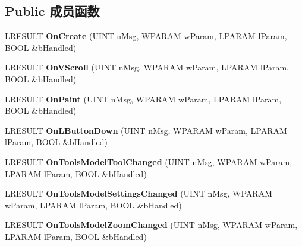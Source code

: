 \subsection*{Public 成员函数}
\begin{DoxyCompactItemize}
\item 
\mbox{\label{class_c_tool_settings_window_a26ab3a242b24b796344a30abcab493f2}} 
L\+R\+E\+S\+U\+LT {\bfseries On\+Create} (U\+I\+NT n\+Msg, W\+P\+A\+R\+AM w\+Param, L\+P\+A\+R\+AM l\+Param, B\+O\+OL \&b\+Handled)
\item 
\mbox{\label{class_c_tool_settings_window_addc0ae6941b0e945b71c7ae6681c1347}} 
L\+R\+E\+S\+U\+LT {\bfseries On\+V\+Scroll} (U\+I\+NT n\+Msg, W\+P\+A\+R\+AM w\+Param, L\+P\+A\+R\+AM l\+Param, B\+O\+OL \&b\+Handled)
\item 
\mbox{\label{class_c_tool_settings_window_a4f3221cd2616c49006933c118a2ab7c4}} 
L\+R\+E\+S\+U\+LT {\bfseries On\+Paint} (U\+I\+NT n\+Msg, W\+P\+A\+R\+AM w\+Param, L\+P\+A\+R\+AM l\+Param, B\+O\+OL \&b\+Handled)
\item 
\mbox{\label{class_c_tool_settings_window_a77e833e49432d8948fa265cd55edd414}} 
L\+R\+E\+S\+U\+LT {\bfseries On\+L\+Button\+Down} (U\+I\+NT n\+Msg, W\+P\+A\+R\+AM w\+Param, L\+P\+A\+R\+AM l\+Param, B\+O\+OL \&b\+Handled)
\item 
\mbox{\label{class_c_tool_settings_window_a6d887ba6b56ad9a18a137c0d7a8ae09b}} 
L\+R\+E\+S\+U\+LT {\bfseries On\+Tools\+Model\+Tool\+Changed} (U\+I\+NT n\+Msg, W\+P\+A\+R\+AM w\+Param, L\+P\+A\+R\+AM l\+Param, B\+O\+OL \&b\+Handled)
\item 
\mbox{\label{class_c_tool_settings_window_ac309aeaf6b653b30db271965a5d4a83f}} 
L\+R\+E\+S\+U\+LT {\bfseries On\+Tools\+Model\+Settings\+Changed} (U\+I\+NT n\+Msg, W\+P\+A\+R\+AM w\+Param, L\+P\+A\+R\+AM l\+Param, B\+O\+OL \&b\+Handled)
\item 
\mbox{\label{class_c_tool_settings_window_a9594567b07bb44146e297c0ed6cda38b}} 
L\+R\+E\+S\+U\+LT {\bfseries On\+Tools\+Model\+Zoom\+Changed} (U\+I\+NT n\+Msg, W\+P\+A\+R\+AM w\+Param, L\+P\+A\+R\+AM l\+Param, B\+O\+OL \&b\+Handled)
\end{DoxyCompactItemize}
